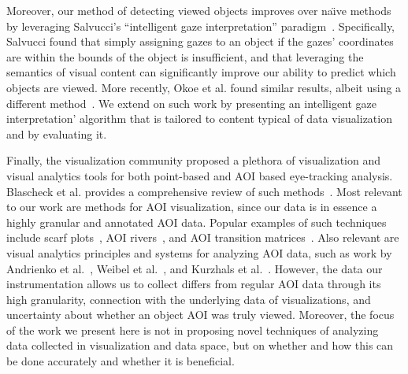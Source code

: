 Moreover, our method of detecting viewed objects improves over na\"{\i}ve methods by leveraging Salvucci's ``intelligent gaze interpretation'' paradigm~\cite{salvucci1999inferring,salvucci2000intelligent}. Specifically, Salvucci found that simply assigning gazes to an object if the gazes' coordinates are within the bounds of the object is insufficient, and that leveraging the semantics of visual content can significantly improve our ability to predict which objects are viewed. More recently, Okoe et al. found similar results, albeit using a different method~\cite{okoe2014gaze,okoe2using}. We extend on such work by presenting an intelligent gaze interpretation' algorithm that is tailored to content typical of data visualization and by evaluating it.
 
Finally, the visualization community proposed a plethora of visualization and visual analytics tools for both point-based and AOI based eye-tracking analysis. Blascheck et al. provides a comprehensive review of such methods~\cite{blascheckstate}. Most relevant to our work are methods for AOI visualization, since our data is in essence a highly granular and annotated AOI data. Popular examples of such techniques include scarf plots~\cite{richardson2005looking}, AOI rivers~\cite{burch2013aoi}, and AOI transition matrices~\cite{goldberg1999computer}. Also relevant are visual analytics principles and systems for analyzing AOI data, such as work by Andrienko et al.~\cite{andrienko2012visual}, Weibel et al.~\cite{weibel2012let}, and Kurzhals et al.~\cite{kurzhals2014iseecube}. However, the data our instrumentation allows us to collect differs from regular AOI data through its high granularity, connection with the underlying data of visualizations, and uncertainty about whether an object AOI was truly viewed. Moreover, the focus of the work we present here is not in proposing novel techniques of analyzing data collected in visualization and data space, but on whether and how this can be done accurately and whether it is beneficial.

